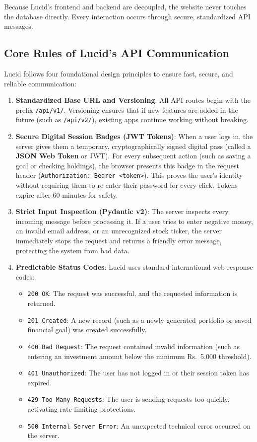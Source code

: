 Because Lucid's frontend and backend are decoupled, the website never touches the database directly. Every interaction occurs through secure, standardized API messages.

\subsection{Core Rules of Lucid's API Communication}
Lucid follows four foundational design principles to ensure fast, secure, and reliable communication:
\begin{enumerate}
    \item \textbf{Standardized Base URL and Versioning}: All API routes begin with the prefix \texttt{/api/v1/}. Versioning ensures that if new features are added in the future (such as \texttt{/api/v2/}), existing apps continue working without breaking.
    \item \textbf{Secure Digital Session Badges (JWT Tokens)}: When a user logs in, the server gives them a temporary, cryptographically signed digital pass (called a \textbf{JSON Web Token} or JWT). For every subsequent action (such as saving a goal or checking holdings), the browser presents this badge in the request header (\texttt{Authorization: Bearer <token>}). This proves the user's identity without requiring them to re-enter their password for every click. Tokens expire after 60 minutes for safety.
    \item \textbf{Strict Input Inspection (Pydantic v2)}: The server inspects every incoming message before processing it. If a user tries to enter negative money, an invalid email address, or an unrecognized stock ticker, the server immediately stops the request and returns a friendly error message, protecting the system from bad data.
    \item \textbf{Predictable Status Codes}: Lucid uses standard international web response codes:
    \begin{itemize}
        \item \texttt{200 OK}: The request was successful, and the requested information is returned.
        \item \texttt{201 Created}: A new record (such as a newly generated portfolio or saved financial goal) was created successfully.
        \item \texttt{400 Bad Request}: The request contained invalid information (such as entering an investment amount below the minimum Rs.~5,000 threshold).
        \item \texttt{401 Unauthorized}: The user has not logged in or their session token has expired.
        \item \texttt{429 Too Many Requests}: The user is sending requests too quickly, activating rate-limiting protections.
        \item \texttt{500 Internal Server Error}: An unexpected technical error occurred on the server.
    \end{itemize}
\end{enumerate}

